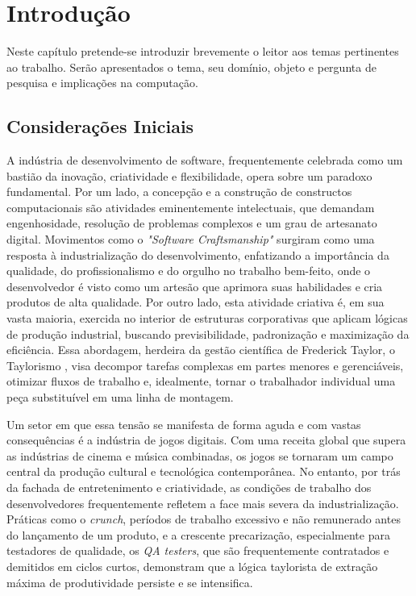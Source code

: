 \chapter{Introdução}\label{cap:introducao}

Neste capítulo pretende-se introduzir brevemente o leitor aos temas pertinentes ao trabalho.
Serão apresentados o tema, seu domínio, objeto e pergunta de pesquisa e 
implicações na computação.

\section{Considerações Iniciais}\label{sec:consideracoes_iniciais}

A indústria de desenvolvimento de software, frequentemente celebrada como um bastião da inovação, criatividade e flexibilidade, 
opera sobre um paradoxo fundamental. Por um lado, a concepção e a construção de constructos computacionais são atividades 
eminentemente intelectuais, que demandam engenhosidade, resolução de problemas complexos e um grau de artesanato digital. 
Movimentos como o \textit{"Software Craftsmanship"} surgiram como uma resposta à industrialização do desenvolvimento, enfatizando a 
importância da qualidade, do profissionalismo e do orgulho no trabalho bem-feito, onde o desenvolvedor é visto como um artesão que 
aprimora suas habilidades e cria produtos de alta qualidade. Por outro lado, esta atividade criativa é, em sua vasta maioria, 
exercida no interior de estruturas corporativas que aplicam lógicas de produção industrial, buscando previsibilidade, padronização e 
maximização da eficiência. Essa abordagem, herdeira da gestão científica de Frederick Taylor, o Taylorismo \cite{Taylor1911}, visa decompor tarefas 
complexas em partes menores e gerenciáveis, otimizar fluxos de trabalho e, idealmente, tornar o trabalhador individual uma peça 
substituível em uma linha de montagem.

Um setor em que essa tensão se manifesta de forma aguda e com vastas consequências é a indústria de jogos digitais. Com uma 
receita global que supera as indústrias de cinema e música combinadas, os jogos se tornaram um campo central da produção cultural e 
tecnológica contemporânea. No entanto, por trás da fachada de entretenimento e criatividade, as condições de trabalho dos 
desenvolvedores frequentemente refletem a face mais severa da industrialização. Práticas como o \textit{crunch}, períodos de trabalho 
excessivo e não remunerado antes do lançamento de um produto, e a crescente precarização, especialmente para testadores de 
qualidade, os \textit{QA testers}, que são frequentemente contratados e demitidos em ciclos curtos, demonstram que a lógica taylorista 
de extração máxima de produtividade persiste e se intensifica. 

